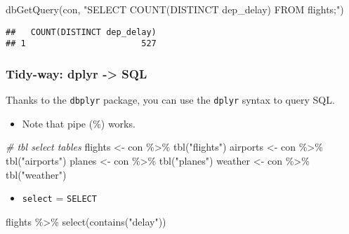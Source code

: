 \documentclass[
]{book}
\newenvironment{Shaded}{\begin{snugshade}}{\end{snugshade}}
\newcommand{\CommentTok}[1]{\textcolor[rgb]{0.56,0.35,0.01}{\textit{#1}}}
\newcommand{\FunctionTok}[1]{\textcolor[rgb]{0.00,0.00,0.00}{#1}}
\newcommand{\NormalTok}[1]{#1}
\newcommand{\OtherTok}[1]{\textcolor[rgb]{0.56,0.35,0.01}{#1}}
\newcommand{\SpecialCharTok}[1]{\textcolor[rgb]{0.00,0.00,0.00}{#1}}
\newcommand{\StringTok}[1]{\textcolor[rgb]{0.31,0.60,0.02}{#1}}
\providecommand{\tightlist}{%
  \setlength{\itemsep}{0pt}\setlength{\parskip}{0pt}}
\begin{document}
\begin{Shaded}
\begin{Highlighting}[]
\FunctionTok{dbGetQuery}\NormalTok{(con, }
           \StringTok{"SELECT COUNT(DISTINCT dep\_delay)}
\StringTok{           FROM flights;"}\NormalTok{)}
\end{Highlighting}
\end{Shaded}

\begin{verbatim}
##   COUNT(DISTINCT dep_delay)
## 1                       527
\end{verbatim}

\hypertarget{tidy-way-dplyr---sql}{%
\subsubsection{Tidy-way: dplyr -\textgreater{} SQL}\label{tidy-way-dplyr---sql}}

Thanks to the \texttt{dbplyr} package, you can use the \texttt{dplyr} syntax to query SQL.

\begin{itemize}
\tightlist
\item
  Note that pipe (\%) works.
\end{itemize}

\begin{Shaded}
\begin{Highlighting}[]
\CommentTok{\# tbl select tables}
\NormalTok{flights }\OtherTok{\textless{}{-}}\NormalTok{ con }\SpecialCharTok{\%\textgreater{}\%} \FunctionTok{tbl}\NormalTok{(}\StringTok{"flights"}\NormalTok{)}
\NormalTok{airports }\OtherTok{\textless{}{-}}\NormalTok{ con }\SpecialCharTok{\%\textgreater{}\%} \FunctionTok{tbl}\NormalTok{(}\StringTok{"airports"}\NormalTok{)}
\NormalTok{planes }\OtherTok{\textless{}{-}}\NormalTok{ con }\SpecialCharTok{\%\textgreater{}\%} \FunctionTok{tbl}\NormalTok{(}\StringTok{"planes"}\NormalTok{)}
\NormalTok{weather }\OtherTok{\textless{}{-}}\NormalTok{ con }\SpecialCharTok{\%\textgreater{}\%} \FunctionTok{tbl}\NormalTok{(}\StringTok{"weather"}\NormalTok{)}
\end{Highlighting}
\end{Shaded}

\begin{itemize}
\tightlist
\item
  \texttt{select} = \texttt{SELECT}
\end{itemize}

\begin{Shaded}
\begin{Highlighting}[]
\NormalTok{flights }\SpecialCharTok{\%\textgreater{}\%} 
  \FunctionTok{select}\NormalTok{(}\FunctionTok{contains}\NormalTok{(}\StringTok{"delay"}\NormalTok{))}
\end{Highlighting}
\end{Shaded}
\end{document}
